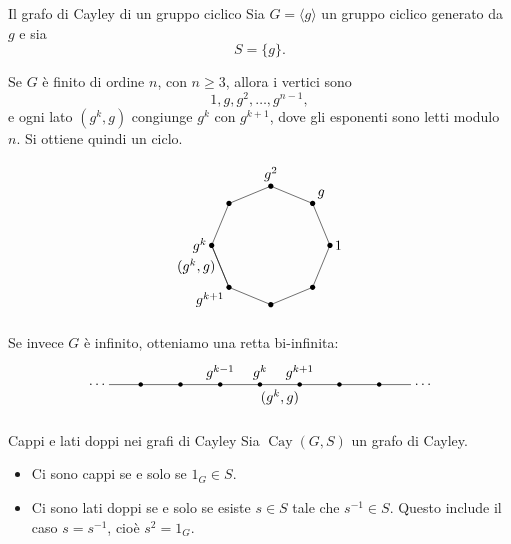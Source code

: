 \documentclass[a4paper]{article}
\begin{document}
\begin{snippetexample}{Il grafo di Cayley di un gruppo ciclico}
    Sia \(G=\langle g\rangle\) un gruppo ciclico generato da \(g\) e sia
    \[
        S=\{g\}.
    \]

    Se \(G\) è finito di ordine \(n\), con \(n\geq 3\), allora i vertici sono
    \[
        1,g,g^2,\ldots,g^{n-1},
    \]
    e ogni lato \((g^k,g)\) congiunge \(g^k\) con \(g^{k+1}\), dove gli esponenti sono letti modulo \(n\). Si ottiene quindi un ciclo.

    \[
        \begin{tikzpicture}[scale=1.1]
            \foreach \i in {0,...,7}{
                \coordinate (v\i) at ({360/8*\i}:1.35);
                \fill (v\i) circle (1.7pt);
            }

            \foreach \i/\j in {0/1,1/2,2/3,3/4,4/5,5/6,6/7,7/0}{
                \draw (v\i)--(v\j);
            }

            \node[right] at (v0) {\(1\)};
            \node[above right] at (v1) {\(g\)};
            \node[above] at (v2) {\(g^2\)};
            \node[left] at (v4) {\(g^k\)};
            \node[below left] at (v5) {\(g^{k+1}\)};

            \draw (v4)--node[left] {\((g^k,g)\)} (v5);
        \end{tikzpicture}
    \]

    Se invece \(G\) è infinito, otteniamo una retta bi-infinita:
    \[
        \begin{tikzpicture}[scale=1]
            \foreach \x in {-3,-2,-1,0,1,2,3}{
                \fill (\x,0) circle (1.6pt);
            }

            \draw (-3.8,0)--(3.8,0);
            \node at (-4.1,0) {\(\cdots\)};
            \node at (4.1,0) {\(\cdots\)};

            \node[above] at (-1,0) {\(g^{k-1}\)};
            \node[above] at (0,0) {\(g^k\)};
            \node[above] at (1,0) {\(g^{k+1}\)};

            \node[below] at (0.5,0) {\((g^k,g)\)};
        \end{tikzpicture}
    \]
\end{snippetexample}

\begin{snippetproposition}{Cappi e lati doppi nei grafi di Cayley}
    Sia \(\operatorname{Cay}(G,S)\) un grafo di Cayley.

    \begin{itemize}
        \item Ci sono cappi se e solo se \(1_G\in S\).
        \item Ci sono lati doppi se e solo se esiste \(s\in S\) tale che \(s^{-1}\in S\). Questo include il caso \(s=s^{-1}\), cioè \(s^2=1_G\).
    \end{itemize}
\end{snippetproposition}
\end{document}
